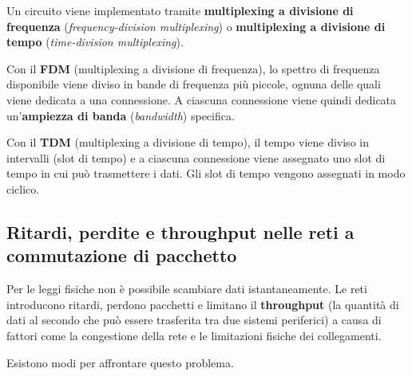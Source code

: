 Un circuito viene implementato tramite \textbf{multiplexing a divisione di frequenza} (\textit{frequency-division multiplexing}) o \textbf{multiplexing a divisione di tempo} (\textit{time-division multiplexing}).

Con il \textbf{FDM} (multiplexing a divisione di frequenza), lo spettro di frequenza disponibile viene diviso in bande di frequenza più piccole, ognuna delle quali viene dedicata a una connessione. A ciascuna connessione viene quindi dedicata un'\textbf{ampiezza di banda} (\textit{bandwidth}) specifica.

Con il \textbf{TDM} (multiplexing a divisione di tempo), il tempo viene diviso in intervalli (slot di tempo) e a ciascuna connessione viene assegnato uno slot di tempo in cui può trasmettere i dati. Gli slot di tempo vengono assegnati in modo ciclico.

\subsection{Ritardi, perdite e throughput nelle reti a commutazione di pacchetto}
Per le leggi fisiche non è possibile scambiare dati istantaneamente. Le reti introducono ritardi, perdono pacchetti e limitano il \textbf{throughput} (la quantità di dati al secondo che può essere trasferita tra due sistemi periferici) a causa di fattori come la congestione della rete e le limitazioni fisiche dei collegamenti.

Esistono modi per affrontare questo problema. 

